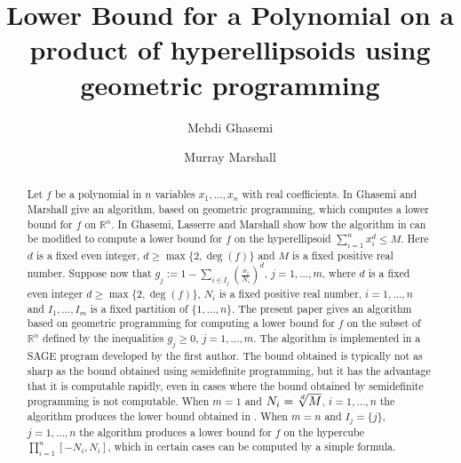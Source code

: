 \documentclass{amsart}
\theoremstyle{definition}
\begin{document}
\title[Lower bound for a polynomial]
 {Lower Bound for a Polynomial on a product of hyperellipsoids using geometric programming}
 \date{}

\author{Mehdi Ghasemi}
\author{Murray Marshall}
\address{Department of Mathematics and Statistics,
University of Saskatchewan,
Saskatoon, \newline \indent
SK S7N 5E6, Canada}


\begin{abstract} Let $f$ be a polynomial in $n$ variables $x_1,\dots,x_n$ with real coefficients. In \cite{gha-mar2} Ghasemi and Marshall give an algorithm, based on geometric programming, which computes a lower bound for $f$ on $\mathbb{R}^n$. In \cite{gha-lass-mar} Ghasemi, Lasserre and Marshall show how the algorithm in \cite{gha-mar2} can be modified to compute a lower bound for $f$ on the hyperellipsoid $\sum_{i=1}^n x_i^d \le M.$ Here  $d$ is a fixed even integer, $d \ge \max\{ 2, \deg(f)\}$ and $M$ is a fixed positive real number. Suppose now that $g_j := 1-\sum_{i\in I_j} (\frac{x_i}{N_i})^d$, $j=1,\dots,m$, where $d$ is a fixed even integer $d \ge \max\{ 2, \deg(f)\}$, $N_i$ is a fixed positive real number, $i=1,\dots,n$ and  $I_1,\dots, I_m$ is a fixed partition of $\{ 1,\dots,n\}$. The present paper gives an algorithm based on geometric programming for computing a lower bound for $f$ on the subset of $\mathbb{R}^n$ defined by the inequalities $g_j\ge 0$, $j=1,\dots,m$. The algorithm is implemented in a SAGE program developed by the first author. The bound obtained is typically not as sharp as the bound obtained using semidefinite programming, but it has the advantage that it is computable rapidly, even in cases where the bound obtained by semidefinite programming is not computable. When $m=1$ and $N_i = \root d \of{M}$, $i=1,\dots,n$ the algorithm produces the lower bound obtained in \cite{gha-lass-mar}. When $m=n$ and $I_j = \{ j \}$, $j=1,\dots,n$ the algorithm produces a lower bound for $f$ on the hypercube $\prod_{i=1}^n [-N_i,N_i]$, which in certain cases can be computed by a simple formula.
\end{abstract}

\maketitle
%
\end{document}
